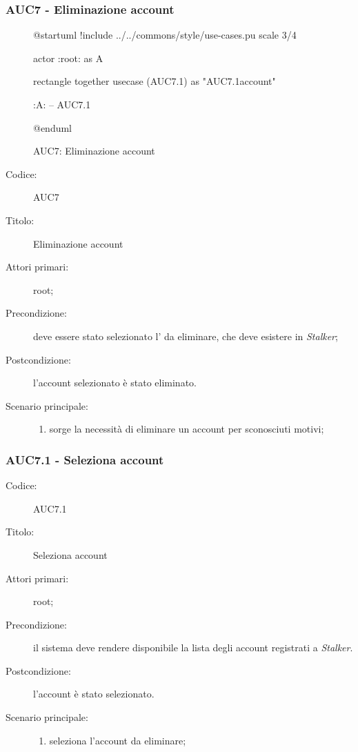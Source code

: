 \documentclass[casi-duso]{subfiles}
\begin{document}
\subsubsection{AUC7 - Eliminazione account}%
\label{subsub:AUC7}

\begin{figure}[h!] 
  \centering 
  \begin{plantuml}
  @startuml
  !include ../../commons/style/use-cases.pu
  scale 3/4

  actor :root: as A

  rectangle {
    together {
      usecase (AUC7.1) as "AUC7.1\nSeleziona account"
    }
  }

  :A: -- AUC7.1

  @enduml
  \end{plantuml} 
  \caption{AUC7: Eliminazione account} 
  \label{fig:auc7} 
\end{figure}

\begin{description}
  \item[Codice:] AUC7
  \item[Titolo:] Eliminazione account
  \item[Attori primari:] root;
  \item[Precondizione:] deve essere stato selezionato l' da eliminare, che deve esistere in \emph{Stalker};
  \item[Postcondizione:] l'account selezionato è stato eliminato.
  \item[Scenario principale:]
  \begin{enumerate}
    \item sorge la necessità di eliminare un account per sconosciuti motivi;
  \end{enumerate}
\end{description}

\subsubsection{AUC7.1 - Seleziona account}%
\label{subsub:AUC7.1}
\begin{description}
  \item[Codice:] AUC7.1
  \item[Titolo:] Seleziona account
  \item[Attori primari:] root;
  \item[Precondizione:] il sistema deve rendere disponibile la lista degli account registrati a \emph{Stalker}.
  \item[Postcondizione:] l'account è stato selezionato.
  \item[Scenario principale:]
  \begin{enumerate}
    \item {} seleziona l'account da eliminare;
  \end{enumerate}
\end{description}
\end{document}

